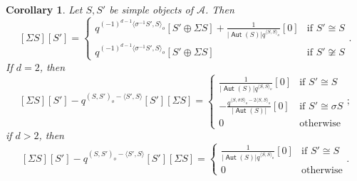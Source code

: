 \documentclass[reqno,12pt,a4paper]{amsart}
\newtheorem{corollary}[theorem]{Corollary}
\theoremstyle{remark}
\theoremstyle{definition}
\newcommand{\opname}[1]{\operatorname{\mathsf{#1}}}
\newcommand{\Aut}{\opname{Aut}}
\newcommand{\ca}{{\mathcal A}}
\numberwithin{equation}{section}
\begin{document}
\begin{corollary}
\label{cor:commutator-for-neighbouring-pieces-simples}
Let $S,S'$ be simple objects of $\ca$. Then
\[
[\Sigma S][S']=\begin{cases} q^{(-1)^{d-1}\langle\sigma^{-1}S',S\rangle_o}[S'\oplus\Sigma S]+\frac{1}{|\Aut(S)|q^{\langle S,S\rangle_o}}[0] & \text{if }S'\cong S\\
q^{(-1)^{d-1}\langle\sigma^{-1}S',S\rangle_o}[S'\oplus\Sigma S] & \text{if }S'\not\cong S
\end{cases}.
\]
If $d=2$, then
\[
[\Sigma S][S']-q^{(S,S')_o-\langle S',S\rangle}[S'][\Sigma S]=
\begin{cases} \frac{1}{|\Aut(S)|q^{\langle S,S\rangle_o}}[0] & \text{if }S'\cong S\\[5pt]
-\frac{q^{\langle S,\sigma S\rangle_o-2\langle S,S\rangle_o}}{|\Aut(S)|}[0] & \text{if }S'\cong\sigma S\\
0 &\text{otherwise}
\end{cases};
\]
if $d>2$, then
\[
[\Sigma S][S']-q^{(S,S')_o-\langle S',S\rangle}[S'][\Sigma S]=
\begin{cases} \frac{1}{|\Aut(S)|q^{\langle S,S\rangle_o}}[0] & \text{if }S'\cong S\\
0 &\text{otherwise}
\end{cases}.
\]
\end{corollary}
\end{document}
